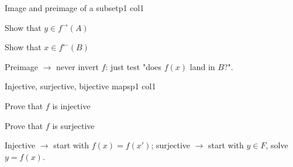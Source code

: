 \documentclass[sheet,noautoquant,noautokw]{neyvia-study}
\begin{document}
\begin{concept}[1.3]{Image and preimage of a subset}{p1 col1}
\begin{definition}
\end{definition}
\begin{method}{Show that $y\in f^{\to}(A)$}
\end{method}
\begin{method}{Show that $x\in f^{\leftarrow}(B)$}
\end{method}
\begin{reflex}
Preimage \ensuremath{\rightarrow} never invert $f$: just test "does $f(x)$ land in $B$?".
\end{reflex}
\end{concept}
\begin{concept}[1.4]{Injective, surjective, bijective maps}{p1 col1}
\begin{definition}
\end{definition}
\begin{method}{Prove that $f$ is injective}
\step{$\displaystyle \cdots$}
\end{method}
\begin{method}{Prove that $f$ is surjective}
\end{method}
\begin{reflex}
Injective \ensuremath{\rightarrow} start with $f(x)=f(x')$; surjective \ensuremath{\rightarrow} start with $y\in F$, solve $y=f(x)$.
\end{reflex}
\end{concept}
\end{document}
